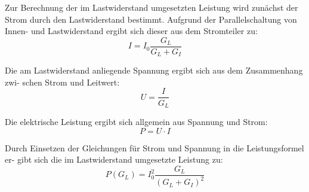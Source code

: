 \noindent
Zur Berechnung der im Lastwiderstand umgesetzten Leistung wird zunächst der Strom
durch den Lastwiderstand bestimmt. Aufgrund der Parallelschaltung von Innen- und
Lastwiderstand ergibt sich dieser aus dem Stromteiler zu:
\begin{equation}
I = I_0 \frac{G_L}{G_L + G_I}
\end{equation}

\noindent
Die am Lastwiderstand anliegende Spannung ergibt sich aus dem Zusammenhang zwi-
schen Strom und Leitwert:
\begin{equation}
U = \frac{I}{G_L}
\end{equation}

\noindent 
Die elektrische Leistung ergibt sich allgemein aus Spannung und Strom:
\begin{equation}
P = U \cdot I
\end{equation}

\noindent
Durch Einsetzen der Gleichungen für Strom und Spannung in die Leistungsformel er-
gibt sich die im Lastwiderstand umgesetzte Leistung zu:
\begin{equation}
P(G_L) = I_0^2 \frac{G_L}{(G_L + G_I)^2}
\end{equation}